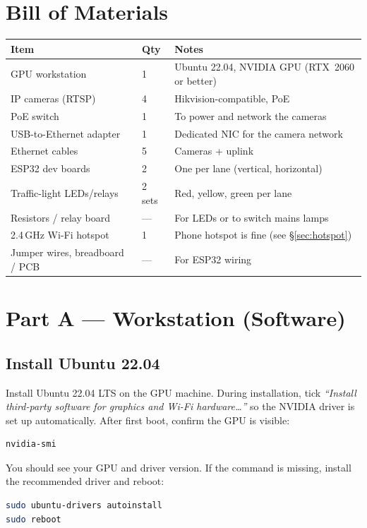 \documentclass[11pt]{article}
\begin{document}
\section{Bill of Materials}
\begin{table}[h]
\centering
\begin{tabular}{@{}lll@{}}
\toprule
\textbf{Item} & \textbf{Qty} & \textbf{Notes} \\
\midrule
GPU workstation & 1 & Ubuntu 22.04, NVIDIA GPU (RTX~2060 or better) \\
IP cameras (RTSP) & 4 & Hikvision-compatible, PoE \\
PoE switch & 1 & To power and network the cameras \\
USB-to-Ethernet adapter & 1 & Dedicated NIC for the camera network \\
Ethernet cables & 5 & Cameras + uplink \\
ESP32 dev boards & 2 & One per lane (vertical, horizontal) \\
Traffic-light LEDs/relays & 2 sets & Red, yellow, green per lane \\
Resistors / relay board & --- & For LEDs or to switch mains lamps \\
2.4\,GHz Wi-Fi hotspot & 1 & Phone hotspot is fine (see \S\ref{sec:hotspot}) \\
Jumper wires, breadboard / PCB & --- & For ESP32 wiring \\
\bottomrule
\end{tabular}
\end{table}

\section{Part A --- Workstation (Software)}

\subsection{Install Ubuntu 22.04}
Install Ubuntu 22.04 LTS on the GPU machine. During installation, tick
\emph{``Install third-party software for graphics and Wi-Fi hardware\ldots''}
so the NVIDIA driver is set up automatically. After first boot, confirm the GPU
is visible:
\begin{lstlisting}[language=bash]
nvidia-smi
\end{lstlisting}
You should see your GPU and driver version. If the command is missing, install
the recommended driver and reboot:
\begin{lstlisting}[language=bash]
sudo ubuntu-drivers autoinstall
sudo reboot
\end{lstlisting}
\end{document}
